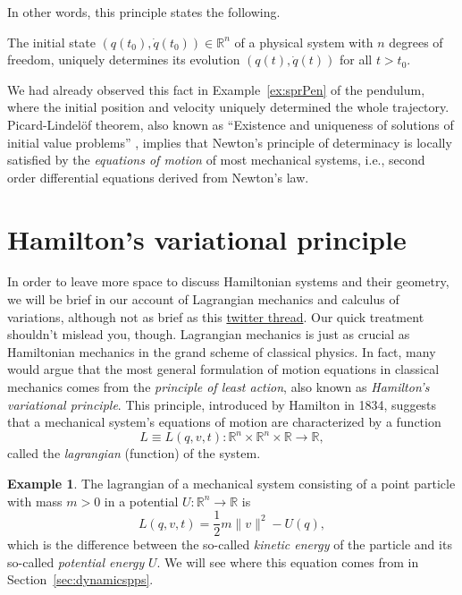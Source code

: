\documentclass[english,fontsize=11pt,paper=b5]{scrbook}
\numberwithin{equation}{chapter}
\theoremstyle{definition}
\newtheorem{example}{Example}[chapter]
\newcommand{\emphidx}[1]{\index{#1}\emph{#1}}
\begin{document}
  In other words, this principle states the following.

  \begin{tcolorbox}[title=Newton's principle of determinacy]
    The initial state $\left(q(t_0), \dot q(t_0)\right) \in \mathbb{R}^n$ of a physical system with $n$ degrees of freedom, uniquely determines its evolution $\left(q(t),\dot q(t)\right)$ for all $t > t_0$.
  \end{tcolorbox}

  We had already observed this fact in Example~\ref{ex:sprPen} of the pendulum, where the initial position and velocity uniquely determined the whole trajectory.
  Picard-Lindel\"of theorem, also known as ``Existence and uniqueness of solutions of initial value problems'' \cite[Theorem 3.17]{book:knauf}, implies that Newton's principle of determinacy is locally satisfied by the \emphidx{equations of motion} of most mechanical systems, i.e., second order differential equations derived from Newton's law.

  \section{Hamilton's variational principle}\label{sec:varpri}

  In order to leave more space to discuss Hamiltonian systems and their geometry, we will be brief in our account of Lagrangian mechanics and calculus of variations, although not as brief as this \href{https://web.archive.org/web/20220404153248/https://twitter.com/j\_bertolotti/status/1397159397596581889}{twitter thread}.
  Our quick treatment shouldn't mislead you, though. Lagrangian mechanics is just as crucial as Hamiltonian mechanics in the grand scheme of classical physics.
  In fact, many would argue that the most general formulation of motion equations in classical mechanics comes from the \emph{principle of least action}, also known as \emph{Hamilton's variational principle}.
This principle, introduced by Hamilton in 1834, suggests that a mechanical system's equations of motion are characterized by a function
  \begin{equation}
    L \equiv L(q, v, t) : \mathbb{R}^n \times \mathbb{R}^n \times \mathbb{R} \to \mathbb{R},
  \end{equation}
  called the \emphidx{lagrangian} (function) of the system.

  \begin{example}
    The lagrangian of a mechanical system consisting of a point particle with mass $m > 0$ in a potential $U : \mathbb{R}^n \to \mathbb{R}$ is
    \begin{equation}
      L(q, v, t) = \frac12 m \|v\|^2 - U(q),
    \end{equation}
    which is the difference between the so-called \emph{kinetic energy} of the particle and its so-called \emph{potential energy} $U$.
    We will see where this equation comes from in Section~\ref{sec:dynamicspps}.
  \end{example}
\end{document}
